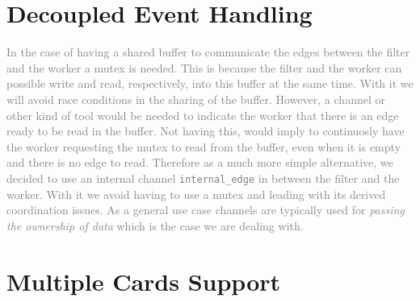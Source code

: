 \section{Decoupled Event Handling}

\textcolor{gray}{
In the case of having a shared buffer to communicate the edges between the filter and the worker a mutex is needed. This is because the filter and the worker can possible write and read, respectively, into this buffer at the same time. With it we will avoid race conditions in the sharing of the buffer. However, a channel or other kind of tool would be needed to indicate the worker that there is an edge ready to be read in the buffer. Not having this, would imply to continuosly have the worker requesting the mutex to read from the buffer, even when it is empty and there is no edge to read. 
Therefore as a much more simple alternative, we decided to use an internal channel \texttt{internal\_edge} in between the filter and the worker. With it we avoid having to use a mutex and leading with its derived coordination issues. As a general use case channels are typically used for \emph{passing the ownership of data} which is the case we are dealing with.
}

\section{Multiple Cards Support}

